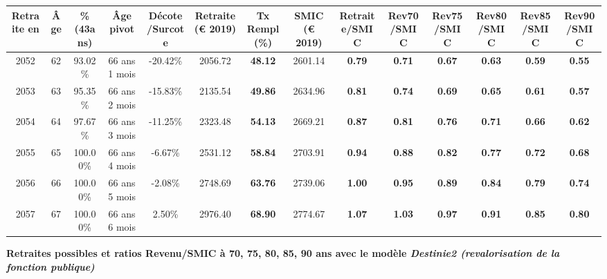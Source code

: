 \begin{adjustbox}{max width=\textwidth} 
\begin{tabular}[htb]{|c|c||c|c|c||c|c||c||c|c|c|c|c|c|} 
\hline 
 Retraite en &  Âge &  \%(43ans) &  Âge pivot &  Décote/Surcote &  Retraite (\euro{} 2019) &  Tx Rempl(\%) &  SMIC (\euro{} 2019) &  Retraite/SMIC &  Rev70/SMIC &  Rev75/SMIC &  Rev80/SMIC &  Rev85/SMIC &  Rev90/SMIC \\ 
\hline \hline 
 2052 &  62 &  93.02\% &  66 ans 1 mois &  -20.42\% &  2056.72 &  {\bf 48.12} &  2601.14 &  {\bf {\color{red} 0.79}} &  {\bf {\color{red} 0.71}} &  {\bf {\color{red} 0.67}} &  {\bf {\color{red} 0.63}} &  {\bf {\color{red} 0.59}} &  {\bf {\color{red} 0.55}} \\ 
\hline 
 2053 &  63 &  95.35\% &  66 ans 2 mois &  -15.83\% &  2135.54 &  {\bf 49.86} &  2634.96 &  {\bf {\color{red} 0.81}} &  {\bf {\color{red} 0.74}} &  {\bf {\color{red} 0.69}} &  {\bf {\color{red} 0.65}} &  {\bf {\color{red} 0.61}} &  {\bf {\color{red} 0.57}} \\ 
\hline 
 2054 &  64 &  97.67\% &  66 ans 3 mois &  -11.25\% &  2323.48 &  {\bf 54.13} &  2669.21 &  {\bf {\color{red} 0.87}} &  {\bf {\color{red} 0.81}} &  {\bf {\color{red} 0.76}} &  {\bf {\color{red} 0.71}} &  {\bf {\color{red} 0.66}} &  {\bf {\color{red} 0.62}} \\ 
\hline 
 2055 &  65 &  100.00\% &  66 ans 4 mois &  -6.67\% &  2531.12 &  {\bf 58.84} &  2703.91 &  {\bf {\color{red} 0.94}} &  {\bf {\color{red} 0.88}} &  {\bf {\color{red} 0.82}} &  {\bf {\color{red} 0.77}} &  {\bf {\color{red} 0.72}} &  {\bf {\color{red} 0.68}} \\ 
\hline 
 2056 &  66 &  100.00\% &  66 ans 5 mois &  -2.08\% &  2748.69 &  {\bf 63.76} &  2739.06 &  {\bf 1.00} &  {\bf {\color{red} 0.95}} &  {\bf {\color{red} 0.89}} &  {\bf {\color{red} 0.84}} &  {\bf {\color{red} 0.79}} &  {\bf {\color{red} 0.74}} \\ 
\hline 
 2057 &  67 &  100.00\% &  66 ans 6 mois &  2.50\% &  2976.40 &  {\bf 68.90} &  2774.67 &  {\bf 1.07} &  {\bf 1.03} &  {\bf {\color{red} 0.97}} &  {\bf {\color{red} 0.91}} &  {\bf {\color{red} 0.85}} &  {\bf {\color{red} 0.80}} \\ 
\hline 
\hline 
\end{tabular} 
\end{adjustbox} 
 
 \vspace{0.1cm} 
{\bf \noindent Retraites possibles et ratios Revenu/SMIC à 70, 75, 80, 85, 90 ans avec le modèle \emph{Destinie2 (revalorisation de la fonction publique)}}  
 
